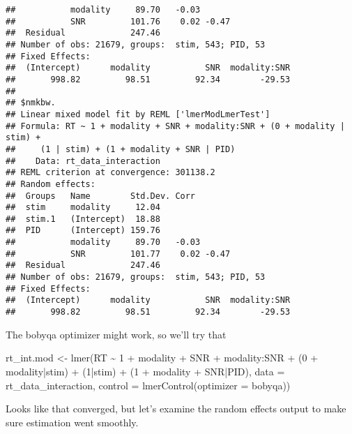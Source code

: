 \documentclass[
]{article}
\newenvironment{Shaded}{\begin{snugshade}}{\end{snugshade}}
\newcommand{\AttributeTok}[1]{\textcolor[rgb]{0.77,0.63,0.00}{#1}}
\newcommand{\DecValTok}[1]{\textcolor[rgb]{0.00,0.00,0.81}{#1}}
\newcommand{\FunctionTok}[1]{\textcolor[rgb]{0.00,0.00,0.00}{#1}}
\newcommand{\NormalTok}[1]{#1}
\newcommand{\OtherTok}[1]{\textcolor[rgb]{0.56,0.35,0.01}{#1}}
\newcommand{\SpecialCharTok}[1]{\textcolor[rgb]{0.00,0.00,0.00}{#1}}
\newcommand{\StringTok}[1]{\textcolor[rgb]{0.31,0.60,0.02}{#1}}
\begin{document}
\begin{verbatim}
##           modality     89.70   -0.03      
##           SNR         101.76    0.02 -0.47
##  Residual             247.46              
## Number of obs: 21679, groups:  stim, 543; PID, 53
## Fixed Effects:
##  (Intercept)      modality           SNR  modality:SNR  
##       998.82         98.51         92.34        -29.53  
## 
## $nmkbw.
## Linear mixed model fit by REML ['lmerModLmerTest']
## Formula: RT ~ 1 + modality + SNR + modality:SNR + (0 + modality | stim) +  
##     (1 | stim) + (1 + modality + SNR | PID)
##    Data: rt_data_interaction
## REML criterion at convergence: 301138.2
## Random effects:
##  Groups   Name        Std.Dev. Corr       
##  stim     modality     12.04              
##  stim.1   (Intercept)  18.88              
##  PID      (Intercept) 159.76              
##           modality     89.70   -0.03      
##           SNR         101.77    0.02 -0.47
##  Residual             247.46              
## Number of obs: 21679, groups:  stim, 543; PID, 53
## Fixed Effects:
##  (Intercept)      modality           SNR  modality:SNR  
##       998.82         98.51         92.34        -29.53
\end{verbatim}

The bobyqa optimizer might work, so we'll try that

\begin{Shaded}
\begin{Highlighting}[]
\NormalTok{rt\_int.mod }\OtherTok{\textless{}{-}} \FunctionTok{lmer}\NormalTok{(RT }\SpecialCharTok{\textasciitilde{}} \DecValTok{1} \SpecialCharTok{+}\NormalTok{ modality }\SpecialCharTok{+}\NormalTok{ SNR }\SpecialCharTok{+}\NormalTok{ modality}\SpecialCharTok{:}\NormalTok{SNR }\SpecialCharTok{+}
\NormalTok{                     (}\DecValTok{0} \SpecialCharTok{+}\NormalTok{ modality}\SpecialCharTok{|}\NormalTok{stim) }\SpecialCharTok{+}\NormalTok{ (}\DecValTok{1}\SpecialCharTok{|}\NormalTok{stim) }\SpecialCharTok{+}\NormalTok{ (}\DecValTok{1} \SpecialCharTok{+}\NormalTok{ modality }\SpecialCharTok{+}\NormalTok{ SNR}\SpecialCharTok{|}\NormalTok{PID), }
                   \AttributeTok{data =}\NormalTok{ rt\_data\_interaction,}
                   \AttributeTok{control =} \FunctionTok{lmerControl}\NormalTok{(}\AttributeTok{optimizer =} \StringTok{\textquotesingle{}bobyqa\textquotesingle{}}\NormalTok{))}
\end{Highlighting}
\end{Shaded}

Looks like that converged, but let's examine the random effects output
to make sure estimation went smoothly.
\end{document}

